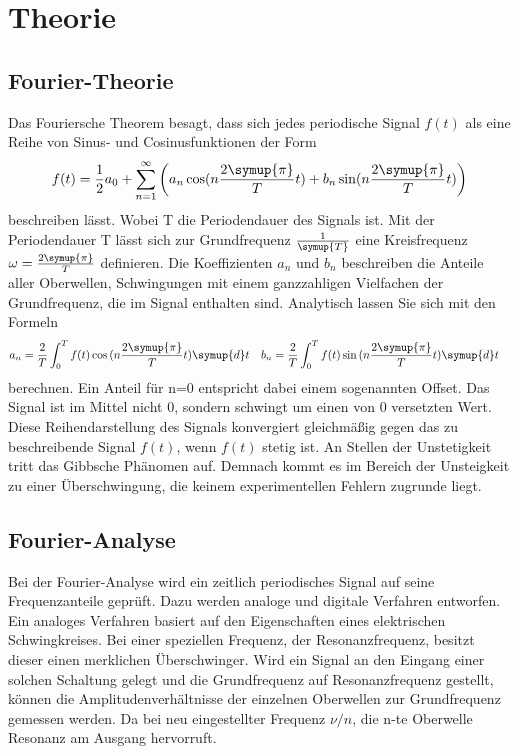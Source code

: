 \section{Theorie}
\label{sec:Theorie}

\subsection{Fourier-Theorie}
Das Fouriersche Theorem besagt, dass sich jedes periodische Signal $f(t)$ als
eine Reihe von Sinus- und Cosinusfunktionen der Form
\begin{equation}
  \label{eqn:Fourier-Reihe}
  f(t)=\frac{1}{2}a_0+\sum_{n=1}^{\infty}\left(a_n \cos(n\frac{2\symup{\pi}}{T}t)+b_n \sin(n\frac{2\symup{\pi}}{T}t)\right)
\end{equation}
beschreiben lässt. Wobei T die Periodendauer des Signals ist.
Mit der Periodendauer T lässt sich zur Grundfrequenz $\frac{1}{\symup{T}}$ eine Kreisfrequenz $\omega=\frac{2\symup{\pi}}{T}$
definieren. Die Koeffizienten $a_n$ und $b_n$ beschreiben die Anteile aller
Oberwellen, Schwingungen mit einem ganzzahligen Vielfachen der Grundfrequenz,
die im Signal enthalten sind. Analytisch lassen Sie sich mit den Formeln
\begin{align}
  a_n & =\frac{2}{T}\int_0^Tf(t)\cos{(n\frac{2\symup{\pi}}{T}t)}\symup{d}t   &
  b_n & =\frac{2}{T}\int_0^{T}f(t)\sin{(n\frac{2\symup{\pi}}{T}t)}\symup{d}t
  \label{eqn:Koeffizienten}
\end{align}
berechnen. Ein Anteil für n=0 entspricht dabei einem sogenannten Offset.
Das Signal ist im Mittel nicht 0, sondern schwingt um einen von 0
versetzten Wert.\\

\noindent Diese Reihendarstellung des Signals konvergiert gleichmäßig
gegen das zu beschreibende Signal $f(t)$, wenn $f(t)$ stetig ist. An Stellen der Unstetigkeit
tritt das Gibbsche Phänomen auf. Demnach kommt es im Bereich der Unsteigkeit zu einer
Überschwingung, die keinem experimentellen Fehlern zugrunde liegt.
\cite{V351}
\subsection{Fourier-Analyse}
Bei der Fourier-Analyse wird ein zeitlich periodisches Signal auf seine
Frequenzanteile geprüft. Dazu werden analoge und digitale Verfahren entworfen.
Ein analoges Verfahren basiert auf den Eigenschaften eines elektrischen
Schwingkreises. Bei einer speziellen Frequenz, der Resonanzfrequenz, besitzt
dieser einen merklichen Überschwinger. Wird ein Signal an den Eingang einer
solchen Schaltung gelegt und die Grundfrequenz auf Resonanzfrequenz gestellt,
können die Amplitudenverhältnisse der einzelnen Oberwellen zur Grundfrequenz
gemessen werden. Da bei neu eingestellter Frequenz $\nu/n$, die n-te Oberwelle
Resonanz am Ausgang hervorruft.\\


